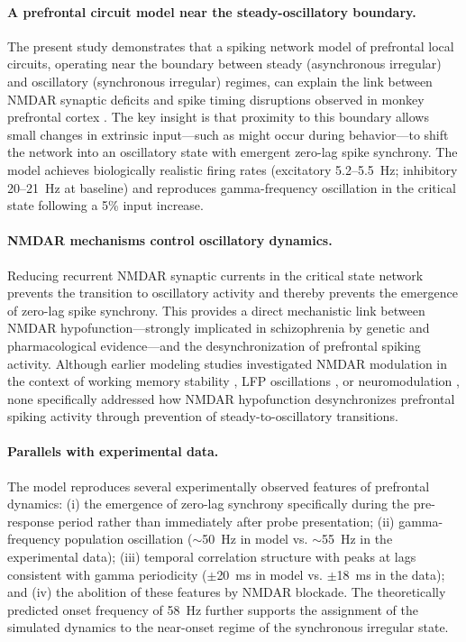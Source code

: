 \documentclass[10pt]{article}
\begin{document}
\paragraph{A prefrontal circuit model near the steady-oscillatory boundary.}
The present study demonstrates that a spiking network model of prefrontal
local circuits, operating near the boundary between steady (asynchronous
irregular) and oscillatory (synchronous irregular) regimes, can explain the
link between NMDAR synaptic deficits and spike timing disruptions observed in
monkey prefrontal cortex \citep{zick2018blocking}. The key insight is that
proximity to this boundary allows small changes in extrinsic input---such as
might occur during behavior---to shift the network into an oscillatory state
with emergent zero-lag spike synchrony. The model achieves biologically
realistic firing rates (excitatory 5.2--5.5~Hz; inhibitory 20--21~Hz at
baseline) and reproduces gamma-frequency oscillation in the critical state
following a 5\% input increase.

\paragraph{NMDAR mechanisms control oscillatory dynamics.}
Reducing recurrent NMDAR synaptic currents in the critical state network
prevents the transition to oscillatory activity and thereby prevents the
emergence of zero-lag spike synchrony. This provides a direct mechanistic
link between NMDAR hypofunction---strongly implicated in schizophrenia by
genetic and pharmacological evidence---and the desynchronization of
prefrontal spiking activity. Although earlier modeling studies investigated
NMDAR modulation in the context of working memory stability
\citep{wang1999synaptic, compte2000synaptic}, LFP oscillations
\citep{brunel2003fast}, or neuromodulation \citep{brunel2001effects}, none
specifically addressed how NMDAR hypofunction desynchronizes prefrontal
spiking activity through prevention of steady-to-oscillatory transitions.

\paragraph{Parallels with experimental data.}
The model reproduces several experimentally observed features of prefrontal
dynamics: (i) the emergence of zero-lag synchrony specifically during the
pre-response period rather than immediately after probe presentation;
(ii) gamma-frequency population oscillation ($\sim$50~Hz in model vs.
$\sim$55~Hz in the experimental data); (iii) temporal correlation structure
with peaks at lags consistent with gamma periodicity ($\pm$20~ms in model
vs. $\pm$18~ms in the data); and (iv) the abolition of these features by
NMDAR blockade. The theoretically predicted onset frequency of 58~Hz further
supports the assignment of the simulated dynamics to the near-onset regime
of the synchronous irregular state.
\end{document}
